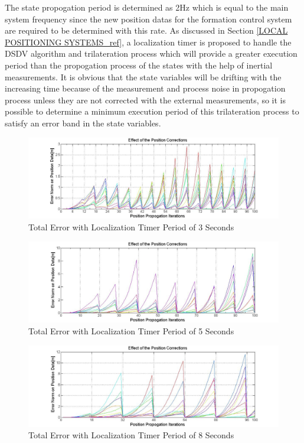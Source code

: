 The state propogation period is determined as 2Hz which is equal to the main system frequency since the new position datas for the formation control system are required to be determined with this rate. 	As discussed in Section \ref{LOCAL POSITIONING SYSTEMS_ref}, a localization timer is proposed to handle the DSDV algorithm and trilateration process which will provide a greater execution period than the propogation process of the states with the help of inertial measurements. It is obvious that the state variables will be drifting with the increasing time because of the measurement and process noise in propogation process unless they are not corrected with the external measurements, so it is possible to determine a minimum execution period of this trilateration process to satisfy an error band in the state variables. 
		
\begin{figure}[H]
\caption{Total Error with Localization Timer Period of 3 Seconds}
\centerline{\includegraphics[scale = 0.4]{Error-0,5Prop-3Update}}
\end{figure} 
		
\begin{figure}[H]
\caption{Total Error with Localization Timer Period of 5 Seconds}
\centerline{\includegraphics[scale = 0.4]{Error-0,5Prop-5Update}}
\end{figure} 

\begin{figure}[H]
\caption{Total Error with Localization Timer Period of 8 Seconds}
\centerline{\includegraphics[scale = 0.4]{Error-0,5Prop-8Update}}
\end{figure} 		
		
